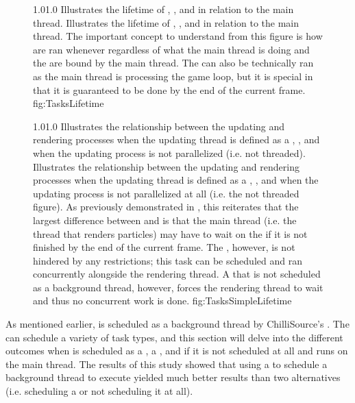 \begin{figure}
\addtocounter{figure}{-1}

	\vspace{-1.5cm}
	{1.0}{1.0}
	{Illustrates the lifetime of , , and  in relation to the main thread.}
	{Illustrates the lifetime of , , and  in relation to the main thread. The important concept to understand from this figure is how  are ran whenever regardless of what the main thread is doing and the  are bound by the main thread. The  can also be technically ran as the main thread is processing the game loop, but it is special in that it is guaranteed to be done by the end of the current frame. }
	{fig:TasksLifetime}

	{1.0}{1.0}
	{Illustrates the relationship between the updating and rendering processes when the updating thread is defined as a , , and when the updating process is not parallelized (i.e. not threaded).}
	{Illustrates the relationship between the updating and rendering processes when the updating thread is defined as a , , and when the updating process is not parallelized at all (i.e. the not threaded figure). As previously demonstrated in , this reiterates that the largest difference between  and  is that the main thread (i.e. the thread that renders particles) may have to wait on the  if it is not finished by the end of the current frame. The , however, is not hindered by any restrictions; this task can be scheduled and ran concurrently alongside the rendering thread. A  that is not scheduled as a background thread, however, forces the rendering thread to wait and thus no concurrent work is done.}
	{fig:TasksSimpleLifetime}

\end{figure}


As mentioned earlier,  is scheduled as a background thread by ChilliSource's . The  can schedule a variety of task types, and this section will delve into the different outcomes when  is scheduled as a , a , and if it is not scheduled at all and runs on the main thread. The results of this study showed that using a  to schedule a background thread to execute  yielded much better results than two alternatives (i.e. scheduling a  or not scheduling it at all).  

